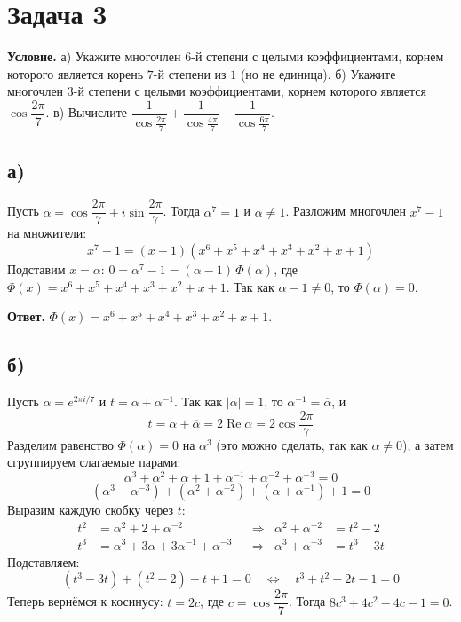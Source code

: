\documentclass[12pt]{article}
\begin{document}
	\section*{Задача 3}

	\noindent
	\textbf{Условие.} а) Укажите многочлен $6$-й степени с целыми коэффициентами, корнем которого является корень $7$-й степени из $1$ (но не единица). б) Укажите многочлен $3$-й степени с целыми коэффициентами, корнем которого является $\cos\dfrac{2\pi}{7}$. в) Вычислите $\dfrac{1}{\cos\frac{2\pi}{7}} + \dfrac{1}{\cos\frac{4\pi}{7}} + \dfrac{1}{\cos\frac{6\pi}{7}}$.
	
	\subsection*{а)}

	Пусть $\alpha = \cos\dfrac{2\pi}{7} + i\sin\dfrac{2\pi}{7}$. Тогда $\alpha^7 = 1$ и $\alpha \neq 1$. Разложим многочлен $x^7 - 1$ на множители:
	\[
		x^7 - 1 = (x - 1)(x^6 + x^5 + x^4 + x^3 + x^2 + x + 1)
	\]
	Подставим $x = \alpha$: $0 = \alpha^7 - 1 = (\alpha - 1)\,\Phi(\alpha)$, где $\Phi(x) = x^6 + x^5 + x^4 + x^3 + x^2 + x + 1$. Так как $\alpha - 1 \neq 0$, то $\Phi(\alpha) = 0$.

	\medskip
	\noindent
	\textbf{Ответ.} $\Phi(x) = x^6 + x^5 + x^4 + x^3 + x^2 + x + 1$.

	\subsection*{б)}

	Пусть $\alpha = e^{2\pi i/7}$ и $t = \alpha + \alpha^{-1}$. Так как $|\alpha| = 1$, то $\alpha^{-1} = \overline{\alpha}$, и
	\[
		t = \alpha + \overline{\alpha} = 2\operatorname{Re}\alpha = 2\cos\frac{2\pi}{7}
	\]
	Разделим равенство $\Phi(\alpha) = 0$ на $\alpha^3$ (это можно сделать, так как $\alpha \neq 0$), а затем сгруппируем слагаемые парами:
	\[
		\alpha^3 + \alpha^2 + \alpha + 1 + \alpha^{-1} + \alpha^{-2} + \alpha^{-3} = 0
	\]
	\[
		(\alpha^3 + \alpha^{-3}) + (\alpha^2 + \alpha^{-2}) + (\alpha + \alpha^{-1}) + 1 = 0
	\]
	Выразим каждую скобку через $t$:
	\begin{align*}
		t^2 &= \alpha^2 + 2 + \alpha^{-2} & &\Longrightarrow & \alpha^2 + \alpha^{-2} &= t^2 - 2 \\
		t^3 &= \alpha^3 + 3\alpha + 3\alpha^{-1} + \alpha^{-3} & &\Longrightarrow & \alpha^3 + \alpha^{-3} &= t^3 - 3t
	\end{align*}
	Подставляем:
	\[
		(t^3 - 3t) + (t^2 - 2) + t + 1 = 0 \quad \Longleftrightarrow \quad t^3 + t^2 - 2t - 1 = 0
	\]
	Теперь вернёмся к косинусу: $t = 2c$, где $c = \cos\dfrac{2\pi}{7}$. Тогда $8c^3 + 4c^2 - 4c - 1 = 0$.
\end{document}
